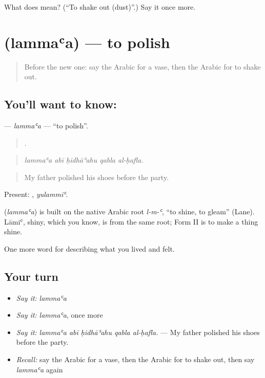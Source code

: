 \begin{tcolorbox}[breakable,colback=teal!4,colframe=teal!35!black,title={Before you move on}]
What does  mean? (\textquotedblleft{}To shake out (dust)\textquotedblright{}.) Say it once more.
\end{tcolorbox}
\section[\texorpdfstring{\ar{لمع} (lammaʿa)}{لمع (lammaʿa)}]{ (lammaʿa) — to polish}

\label{lesson:AR-C550-lammaa}



\begin{quote}
Before the new one: say the Arabic for a vase, then the Arabic for to shake out.
\end{quote}

\subsection*{You'll want to know: }
\textbf{} — \emph{lammaʿa} — \textquotedblleft{}to polish\textquotedblright{}.

\begin{quote}
    .
\end{quote}

\begin{quote}
\emph{lammaʿa abī ḥidhāʾahu qabla al-ḥafla.}
\end{quote}

\begin{quote}
My father polished his shoes before the party.
\end{quote}

Present: , \emph{yulammiʿ}.

\begin{cousinweb}
\textbf{} (\emph{lammaʿa}) is built on the native Arabic root \emph{l-m-ʿ}, \textquotedblleft{}to shine, to gleam\textquotedblright{} (Lane). Lāmiʿ, shiny, which you know, is from the same root; Form II is to make a thing shine.
\end{cousinweb}

\begin{grammarlens}[title={What you've built}]
One more word for describing what you lived and felt.
\end{grammarlens}

\subsection*{Your turn}
\begin{itemize}
\raggedright
  \item \emph{Say it:} \emph{lammaʿa}
  \item \emph{Say it:} \emph{lammaʿa}, once more
  \item \emph{Say it:} \emph{lammaʿa abī ḥidhāʾahu qabla al-ḥafla.} — My father polished his shoes before the party.
  \item \emph{Recall:} say the Arabic for a vase, then the Arabic for to shake out, then say \emph{lammaʿa} again
\end{itemize}

